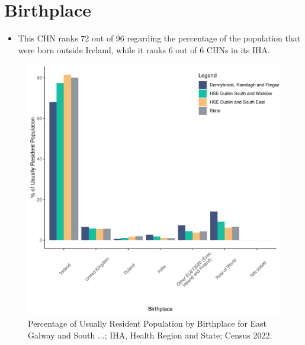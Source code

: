 \documentclass{article}
\begin{document}
\section{Birthplace}\label{sect:Birth}
\begin{itemize}
\item This CHN ranks  72 out of 96 regarding the percentage of the population that were born outside Ireland, while it ranks  6 out of 6 CHNs in its IHA.
\end{itemize}
\begin{figure}[H]
	\centering
	\includegraphics[width = 130mm]{../figures/BirthED.pdf}
	\caption{Percentage of Usually Resident Population by Birthplace for East Galway and South ...; IHA, Health Region and State; Census 2022.}
	\label{fig:vbnv}
	\end{figure}
	
\end{document}
